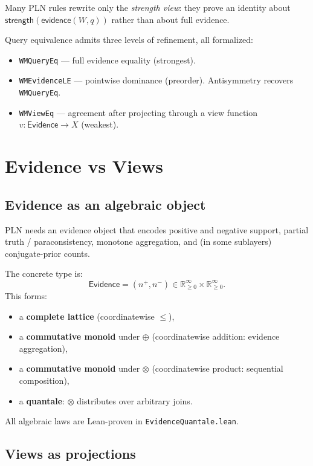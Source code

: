 \documentclass[]{article}
\newcommand{\code}[1]{\texttt{#1}}
\newcommand{\Evidence}{\mathsf{Evidence}}
\newcommand{\Strength}{\mathsf{strength}}
\newcommand{\ev}{\mathsf{evidence}}
\begin{document}
Many PLN rules rewrite only the \emph{strength view}: they prove an
identity about $\Strength(\ev(W,q))$ rather than about full evidence.

Query equivalence admits three levels of refinement, all formalized:
\begin{itemize}[leftmargin=2em]
\item \code{WMQueryEq} --- full evidence equality (strongest).
\item \code{WMEvidenceLE} --- pointwise dominance (preorder).
  Antisymmetry recovers \code{WMQueryEq}.
\item \code{WMViewEq} --- agreement after projecting through a view
  function $v : \Evidence \to X$ (weakest).
\end{itemize}


\section{Evidence vs Views}
\label{sec:evidence}

\subsection{Evidence as an algebraic object}

PLN needs an evidence object that encodes positive and negative support,
partial truth / paraconsistency, monotone aggregation, and (in some
sublayers) conjugate-prior counts.

The concrete type is:
\[
  \Evidence = (n^+, n^-) \in \mathbb{R}_{\ge 0}^\infty \times
  \mathbb{R}_{\ge 0}^\infty.
\]
This forms:
\begin{itemize}[leftmargin=2em]
\item a \textbf{complete lattice} (coordinatewise $\le$),
\item a \textbf{commutative monoid} under $\oplus$ (coordinatewise
  addition: evidence aggregation),
\item a \textbf{commutative monoid} under $\otimes$ (coordinatewise
  product: sequential composition),
\item a \textbf{quantale}: $\otimes$ distributes over arbitrary joins.
\end{itemize}

All algebraic laws are Lean-proven in \code{EvidenceQuantale.lean}.


\subsection{Views as projections}
\end{document}
